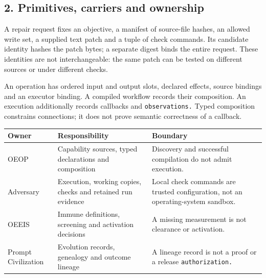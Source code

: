 \documentclass[
  11pt,
]{article}
\begin{document}
\subsection{2. Primitives, carriers and
ownership}\label{primitives-carriers-and-ownership}

A repair request fixes an objective, a manifest of source-file hashes,
an allowed write set, a supplied text patch and a tuple of check
commands. Its candidate identity hashes the patch bytes; a separate
digest binds the entire request. These identities are not
interchangeable: the same patch can be tested on different sources or
under different checks.

An operation has ordered input and output slots, declared effects,
source bindings and an executor binding. A compiled workflow records
their composition. An execution additionally records callbacks and
\nolinkurl{observations.} Typed composition constrains connections; it
does not prove semantic correctness of a callback.

\begin{longtable}[]{@{}
  >{\raggedright\arraybackslash}p{}
  >{\raggedright\arraybackslash}p{}
  >{\raggedright\arraybackslash}p{}@{}}
\toprule\noalign{}
\begin{minipage}[b]{\linewidth}\raggedright
Owner
\end{minipage} & \begin{minipage}[b]{\linewidth}\raggedright
Responsibility
\end{minipage} & \begin{minipage}[b]{\linewidth}\raggedright
Boundary
\end{minipage} \\
\midrule\noalign{}
\endhead
\bottomrule\noalign{}
\endlastfoot
OEOP & Capability sources, typed declarations and composition &
Discovery and successful compilation do not admit execution. \\
Adversary & Execution, working copies, checks and retained run evidence &
Local check commands are trusted configuration, not an operating-system
sandbox. \\
OEEIS & Immune definitions, screening and activation decisions & A
missing measurement is not clearance or activation. \\
Prompt Civilization & Evolution records, genealogy and outcome lineage &
A lineage record is not a proof or a release
\nolinkurl{authorization.} \\
\end{longtable}
\end{document}
